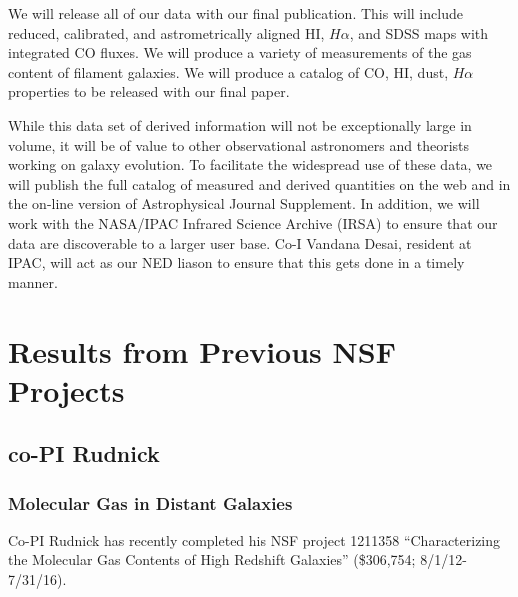 \documentclass[11pt, preprint]{aastex}
\begin{document}
{We will release all of our data with our final publication.  This will include 
reduced, calibrated, and astrometrically aligned HI,
$H\alpha$, and SDSS maps with integrated CO fluxes.
We will produce a variety of measurements of the gas content of
filament galaxies.  We will produce a catalog of CO, HI, dust, $H\alpha$
properties to be released with our final paper.

While this data set of derived information will not be exceptionally
large in volume, it will be of value to other observational
astronomers and theorists working on galaxy evolution. To facilitate
the widespread use of these data, we will publish the full catalog of
measured and derived quantities on the web and in the on-line version
of Astrophysical Journal Supplement. In addition, we will work with
the NASA/IPAC Infrared Science Archive (IRSA) to ensure that our data are
discoverable to a larger user base. Co-I Vandana Desai, resident at
IPAC, will act as our NED liason to ensure that this gets done in a
timely manner.

\section{Results from Previous NSF Projects}
\vspace*{-.4cm}
\subsection{co-PI Rudnick}
\vspace*{-.4cm}
\label{Sec:prior_rudnick}
\subsubsection{Molecular Gas in Distant Galaxies}
\vspace*{-.4cm}

Co-PI Rudnick has recently completed his NSF project 1211358
``Characterizing the Molecular Gas Contents of High Redshift
Galaxies'' (\$306,754; 8/1/12-7/31/16).  

}
\end{document}
